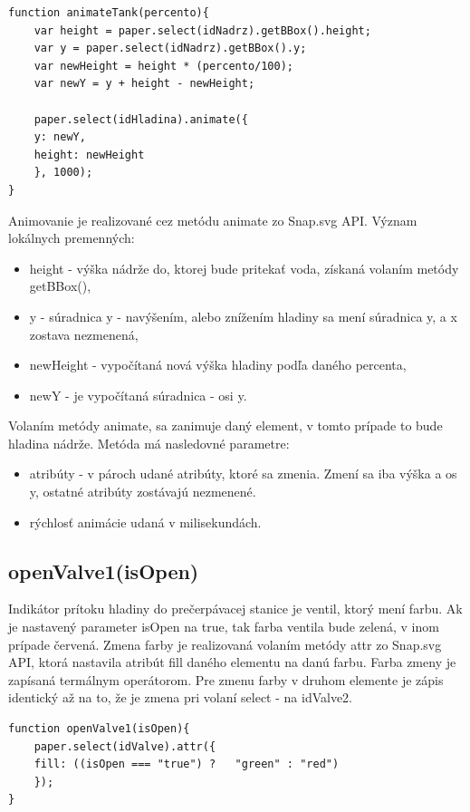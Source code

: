 \begin{lstlisting}
function animateTank(percento){
	var height = paper.select(idNadrz).getBBox().height;
	var y = paper.select(idNadrz).getBBox().y;
	var newHeight = height * (percento/100);
	var newY = y + height - newHeight;
	
	paper.select(idHladina).animate({
	y: newY,
	height: newHeight
	}, 1000);
}
\end{lstlisting}

Animovanie je realizované cez metódu animate zo Snap.svg API. 
Význam lokálnych premenných: 
\begin{itemize}
	\item height - výška nádrže do, ktorej bude pritekať voda,  získaná volaním metódy getBBox(),
	\item y - súradnica y - navýšením, alebo znížením hladiny sa mení súradnica y, a x zostava nezmenená,
	\item newHeight - vypočítaná nová výška hladiny podľa daného percenta, 
	\item newY - je vypočítaná súradnica - osi y. 
\end{itemize}

Volaním metódy animate, sa zanimuje daný element, v tomto prípade to bude hladina nádrže. Metóda má nasledovné parametre: \begin{itemize}
	\item atribúty - v pároch udané atribúty, ktoré sa zmenia. Zmení sa iba výška a os y, ostatné atribúty zostávajú nezmenené.
	\item rýchlosť animácie udaná v milisekundách. 
\end{itemize}

 
\subsection{openValve1(isOpen)}
Indikátor prítoku hladiny do prečerpávacej stanice je ventil, ktorý mení farbu. Ak je nastavený parameter isOpen na true, tak farba ventila bude zelená, v inom prípade červená. 
Zmena farby je realizovaná volaním metódy attr zo Snap.svg API, ktorá nastavila atribút fill daného elementu na danú farbu. Farba zmeny je zapísaná termálnym operátorom. 
Pre zmenu farby v druhom elemente je zápis identický až na to, že je zmena pri volaní select - na idValve2. 
\begin{lstlisting}
function openValve1(isOpen){
	paper.select(idValve).attr({
	fill: ((isOpen === "true") ?   "green" : "red")
	});
}
\end{lstlisting}




